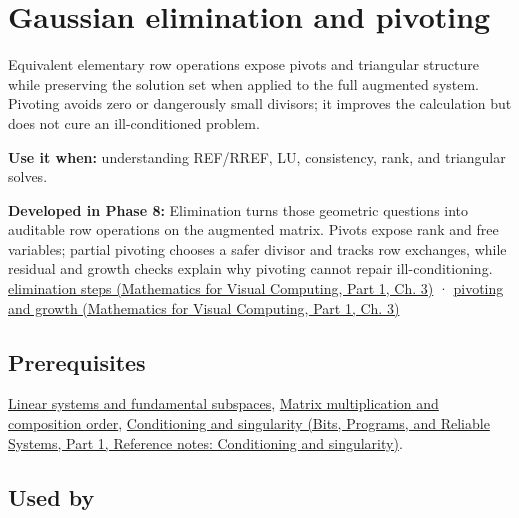 \hypertarget{appendix-f6e77f4a200f}{}\label{referencestart:appendix-f6e77f4a200f}
\section{Gaussian elimination and pivoting}\label{appendix-f6e77f4a200f-gaussian-elimination-and-pivoting}

\hypertarget{appendix-f6e77f4a200f-gaussian-elimination-and-pivoting}{}

Equivalent elementary row operations expose pivots and triangular structure while preserving the solution set when applied to the full augmented system. Pivoting avoids zero or dangerously small divisors; it improves the calculation but does not cure an ill-conditioned problem.

\textbf{Use it when:} understanding REF/RREF, LU, consistency, rank, and triangular solves.

\textbf{Developed in Phase 8:} Elimination turns those geometric questions into auditable row operations on the augmented matrix. Pivots expose rank and free variables; partial pivoting chooses a safer divisor and tracks row exchanges, while residual and growth checks explain why pivoting cannot repair ill-conditioning. \href{../02-Mathematics-for-Visual-Computing-P01/main.pdf\#01-foundations-i-ch019-elimination-turns-the-geometry-into-an-auditable-calculation}{elimination steps (Mathematics for Visual Computing, Part 1, Ch. 3)} · \href{../02-Mathematics-for-Visual-Computing-P01/main.pdf\#01-foundations-i-ch019-pivoting-separates-algorithm-failure-from-matrix-failure}{pivoting and growth (Mathematics for Visual Computing, Part 1, Ch. 3)}

\subsection{Prerequisites}\label{appendix-f6e77f4a200f-prerequisites}

\hypertarget{appendix-f6e77f4a200f-prerequisites}{}

\hyperref[appendix-8572a4a060c1]{Linear systems and fundamental subspaces}, \hyperref[appendix-ab31ef447dbf]{Matrix multiplication and composition order}, \href{../01-Bits-Programs-and-Reliable-Systems-P01/main.pdf\#appendix-8f6a01f284a7}{Conditioning and singularity (Bits, Programs, and Reliable Systems, Part 1, Reference notes: Conditioning and singularity)}.

\subsection{Used by}\label{appendix-f6e77f4a200f-used-by}

